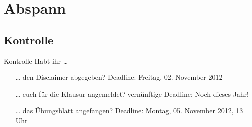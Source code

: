 \documentclass[usepdftitle=false,hyperref={pdfpagelabels=false}]{beamer}
\begin{document}
\section{Abspann}
\subsection{Kontrolle}
\begin{frame}{Kontrolle}
    Habt ihr \dots
    \begin{itemize}
        \item[\dots] den Disclaimer abgegeben? {\tiny Deadline: Freitag, 02. November 2012}
        \item[\dots] euch für die Klausur angemeldet? {\tiny vernünftige Deadline: Noch dieses Jahr!}
        \item[\dots] das Übungsblatt angefangen? {\tiny Deadline: Montag, 05. November 2012, 13 Uhr}
    \end{itemize}
\end{frame}
\end{document}
